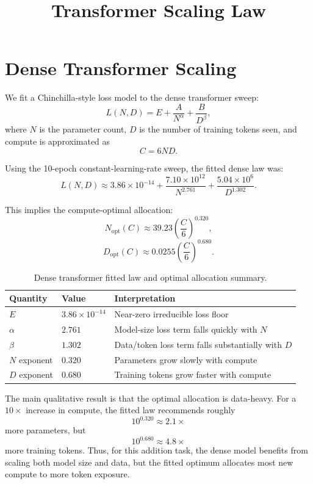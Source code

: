 \documentclass[11pt]{article}
\title{Transformer Scaling Law}
\author{}
\date{}
\begin{document}
\maketitle

\section{Dense Transformer Scaling}

We fit a Chinchilla-style loss model to the dense transformer sweep:
\[
  L(N, D) = E + \frac{A}{N^\alpha} + \frac{B}{D^\beta},
\]
where \(N\) is the parameter count, \(D\) is the number of training tokens seen,
and compute is approximated as
\[
  C = 6ND.
\]

Using the 10-epoch constant-learning-rate sweep, the fitted dense law was:
\[
  L(N, D)
  \approx
  3.86 \times 10^{-14}
  + \frac{7.10 \times 10^{12}}{N^{2.761}}
  + \frac{5.04 \times 10^{6}}{D^{1.302}}.
\]

This implies the compute-optimal allocation:
\[
  N_{\mathrm{opt}}(C)
  \approx
  39.23 \left(\frac{C}{6}\right)^{0.320},
\]
\[
  D_{\mathrm{opt}}(C)
  \approx
  0.0255 \left(\frac{C}{6}\right)^{0.680}.
\]

\begin{table}[h]
\centering
\begin{tabular}{lll}
\toprule
Quantity & Value & Interpretation \\
\midrule
\(E\) & \(3.86 \times 10^{-14}\) & Near-zero irreducible loss floor \\
\(\alpha\) & \(2.761\) & Model-size loss term falls quickly with \(N\) \\
\(\beta\) & \(1.302\) & Data/token loss term falls substantially with \(D\) \\
\(N\) exponent & \(0.320\) & Parameters grow slowly with compute \\
\(D\) exponent & \(0.680\) & Training tokens grow faster with compute \\
\bottomrule
\end{tabular}
\caption{Dense transformer fitted law and optimal allocation summary.}
\end{table}

The main qualitative result is that the optimal allocation is data-heavy.
For a \(10\times\) increase in compute, the fitted law recommends roughly
\[
  10^{0.320} \approx 2.1\times
\]
more parameters, but
\[
  10^{0.680} \approx 4.8\times
\]
more training tokens. Thus, for this addition task, the dense model benefits
from scaling both model size and data, but the fitted optimum allocates most
new compute to more token exposure.
\end{document}
